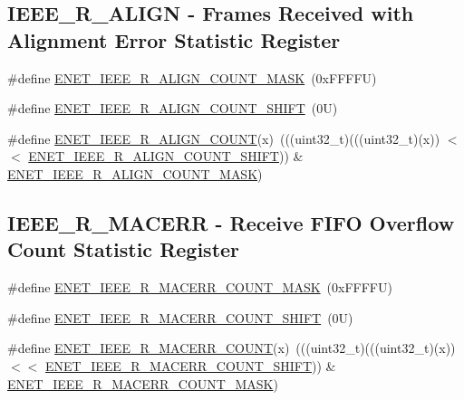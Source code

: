 \subsection*{I\+E\+E\+E\+\_\+\+R\+\_\+\+A\+L\+I\+GN -\/ Frames Received with Alignment Error Statistic Register}
\begin{DoxyCompactItemize}
\item 
\#define \mbox{\hyperlink{group___e_n_e_t___register___masks_ga43a415932380ce1dd7a3c8dded1421a7}{E\+N\+E\+T\+\_\+\+I\+E\+E\+E\+\_\+\+R\+\_\+\+A\+L\+I\+G\+N\+\_\+\+C\+O\+U\+N\+T\+\_\+\+M\+A\+SK}}~(0x\+F\+F\+F\+F\+U)
\item 
\#define \mbox{\hyperlink{group___e_n_e_t___register___masks_ga6a0f2d8593a546427d3f84a22dc05343}{E\+N\+E\+T\+\_\+\+I\+E\+E\+E\+\_\+\+R\+\_\+\+A\+L\+I\+G\+N\+\_\+\+C\+O\+U\+N\+T\+\_\+\+S\+H\+I\+FT}}~(0\+U)
\item 
\#define \mbox{\hyperlink{group___e_n_e_t___register___masks_ga6e6197d91cb433929a390c9355a43673}{E\+N\+E\+T\+\_\+\+I\+E\+E\+E\+\_\+\+R\+\_\+\+A\+L\+I\+G\+N\+\_\+\+C\+O\+U\+NT}}(x)~(((uint32\+\_\+t)(((uint32\+\_\+t)(x)) $<$$<$ \mbox{\hyperlink{group___e_n_e_t___register___masks_ga6a0f2d8593a546427d3f84a22dc05343}{E\+N\+E\+T\+\_\+\+I\+E\+E\+E\+\_\+\+R\+\_\+\+A\+L\+I\+G\+N\+\_\+\+C\+O\+U\+N\+T\+\_\+\+S\+H\+I\+FT}})) \& \mbox{\hyperlink{group___e_n_e_t___register___masks_ga43a415932380ce1dd7a3c8dded1421a7}{E\+N\+E\+T\+\_\+\+I\+E\+E\+E\+\_\+\+R\+\_\+\+A\+L\+I\+G\+N\+\_\+\+C\+O\+U\+N\+T\+\_\+\+M\+A\+SK}})
\end{DoxyCompactItemize}
\subsection*{I\+E\+E\+E\+\_\+\+R\+\_\+\+M\+A\+C\+E\+RR -\/ Receive F\+I\+FO Overflow Count Statistic Register}
\begin{DoxyCompactItemize}
\item 
\#define \mbox{\hyperlink{group___e_n_e_t___register___masks_gaec114f8a37da297fa258d22d3d275def}{E\+N\+E\+T\+\_\+\+I\+E\+E\+E\+\_\+\+R\+\_\+\+M\+A\+C\+E\+R\+R\+\_\+\+C\+O\+U\+N\+T\+\_\+\+M\+A\+SK}}~(0x\+F\+F\+F\+F\+U)
\item 
\#define \mbox{\hyperlink{group___e_n_e_t___register___masks_ga80d5b1a8081a8c2f0601dea66aeb5d04}{E\+N\+E\+T\+\_\+\+I\+E\+E\+E\+\_\+\+R\+\_\+\+M\+A\+C\+E\+R\+R\+\_\+\+C\+O\+U\+N\+T\+\_\+\+S\+H\+I\+FT}}~(0\+U)
\item 
\#define \mbox{\hyperlink{group___e_n_e_t___register___masks_gaefde5abf1a53c9ab231f653876924e7f}{E\+N\+E\+T\+\_\+\+I\+E\+E\+E\+\_\+\+R\+\_\+\+M\+A\+C\+E\+R\+R\+\_\+\+C\+O\+U\+NT}}(x)~(((uint32\+\_\+t)(((uint32\+\_\+t)(x)) $<$$<$ \mbox{\hyperlink{group___e_n_e_t___register___masks_ga80d5b1a8081a8c2f0601dea66aeb5d04}{E\+N\+E\+T\+\_\+\+I\+E\+E\+E\+\_\+\+R\+\_\+\+M\+A\+C\+E\+R\+R\+\_\+\+C\+O\+U\+N\+T\+\_\+\+S\+H\+I\+FT}})) \& \mbox{\hyperlink{group___e_n_e_t___register___masks_gaec114f8a37da297fa258d22d3d275def}{E\+N\+E\+T\+\_\+\+I\+E\+E\+E\+\_\+\+R\+\_\+\+M\+A\+C\+E\+R\+R\+\_\+\+C\+O\+U\+N\+T\+\_\+\+M\+A\+SK}})
\end{DoxyCompactItemize}
